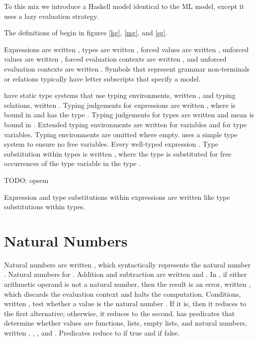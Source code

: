 To this mix we introduce a Haskell model identical to the ML model, except it uses a lazy evaluation strategy.

The definitions of \thehaskellmlscheme begin in figures \ref{hg}, \ref{mg}, and \ref{sg}.

Expressions are written \varexp, types are written \varty, forced values are written \varvalf, unforced values are written \varvalu, forced evaluation contexts are written \varconf, and unforced evaluation contexts are written \varconu. Symbols that represent grammar non-terminals or relations typically have letter subscripts that specify a model.

\Thehaskellml have static type systems that use typing environments, written \env, and typing relations, written \jud. Typing judgements for expressions are written \jude{\env}{\jud}{\varexp}{\varty}, where \varexp is bound in \env and has the type \varty. Typing judgements for types are written \judt{\env}{\jud}{\varty} and mean \varty is bound in \env. Extended typing environments are written \envexte{\env}{\varvar}{\varty} for variables and \envextt{\env}{\tyvar} for type variables. Typing environments are omitted where empty. \Thescheme uses a simple type system to ensure no free variables. Every well-typed \scheme expression \hastype{\tytst}. Type substitution within types is written , where the type  is substituted for free occurrences of the type variable  in the type .

TODO: opsem

Expression and type substitutions within expressions are written like type substitutions within types.

\section{Natural Numbers}

Natural numbers are written \expnum{\varnum}, which syntactically represents the natural number \varnum. Natural numbers \havetype{\tynum} for \thehaskellml. Addition and subtraction are written \expadd{\varexp}{\varexp} and \expsub{\varexp}{\varexp}. In \thescheme, if either arithmetic operand is not a natural number, then the result is an error, written \expwrongd{\errnum}, which discards the evaluation context and halts the computation. Conditions, written \expif{\varexp}{\varexp}{\varexp}, test whether a value is the natural number . If it is, then it reduces to the first alternative; otherwise, it reduces to the second. \Thescheme has predicates that determine whether values are functions, lists, empty lists, and natural numbers, written \exppfun{\varexps}, \expplist{\varexps}, \exppnull{\varexps}, and \exppnum{\varexps}. Predicates reduce to  if true and  if false.

